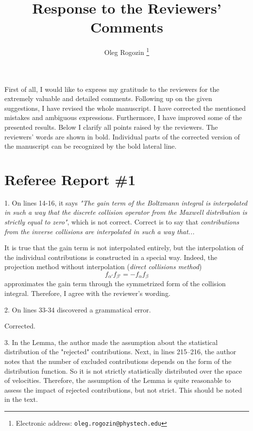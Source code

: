 \documentclass{article}
\title{Response to the Reviewers' Comments}
\author{Oleg Rogozin%
    \thanks{Electronic address: \texttt{oleg.rogozin@phystech.edu}}
}
\begin{document}
\maketitle

First of all, I would like to express my gratitude to the reviewers
for the extremely valuable and detailed comments.
Following up on the given suggestions, I have revised the whole
manuscript. I have corrected the mentioned mistakes and ambiguous expressions.
Furthermore, I have improved some of the presented results.
Below I clarify all points raised by the reviewers.
The reviewers' words are shown in bold.
Individual parts of the corrected version of the manuscript
can be recognized by the bold lateral line.

\section{Referee Report \#1}

\begin{quoting}
1. On lines 14-16, it says \emph{"The gain term of the Boltzmann integral is interpolated in such a way
that the discrete collision operator from the Maxwell distribution is strictly equal to zero"},
which is not correct.
Correct is to say that \emph{contributions from the inverse collisions are interpolated in such a way that...}
\end{quoting}

It is true that the gain term is not interpolated entirely, but the interpolation of the individual contributions
is constructed in a special way. Indeed, the projection method without interpolation (\emph{direct collisions method})
\begin{equation}
    f_{\alpha'} f_{\beta'} = - f_\alpha f_\beta
\end{equation}
approximates the gain term through the symmetrized form of the collision integral.
Therefore, I agree with the reviewer's wording.

\begin{quoting}
2. On lines 33-34 discovered a grammatical error.
\end{quoting}

Corrected.

\begin{quoting}
3. In the Lemma, the author made the assumption about the statistical distribution of the "rejected" contributions.
Next, in lines 215--216, the author notes that the number of excluded contributions depends on the form of the distribution function.
So it is not strictly statistically distributed over the space of velocities.
Therefore, the assumption of the Lemma is quite reasonable to assess the impact of rejected contributions, but not strict.
This should be noted in the text.
\end{quoting}
\end{document}
